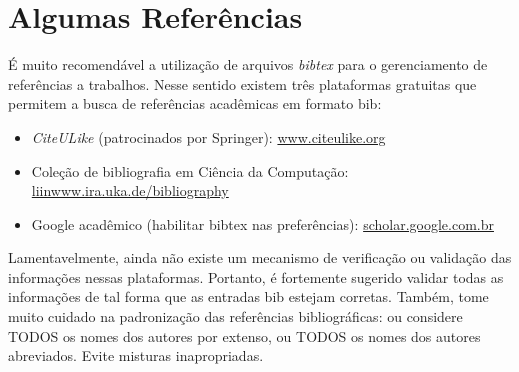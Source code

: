 \section{Algumas Referências}
\label{sec:algumas_referencias}

É muito recomendável a utilização de arquivos \emph{bibtex} para o gerenciamento
de referências a trabalhos. Nesse sentido existem três plataformas gratuitas
que permitem a busca de referências acadêmicas em formato bib: 
\begin{itemize}
	\item \emph{CiteULike} (patrocinados por Springer): \url{www.citeulike.org}
	\item Coleção de bibliografia em Ciência da Computação: \url{liinwww.ira.uka.de/bibliography}
	\item Google acadêmico (habilitar bibtex nas preferências): \url{scholar.google.com.br}
\end{itemize}
Lamentavelmente, ainda não existe um mecanismo de verificação ou validação das
informações nessas plataformas. Portanto, é fortemente sugerido validar todas
as informações de tal forma que as entradas bib estejam corretas.  Também, tome
muito cuidado na padronização das referências bibliográficas: ou considere TODOS
os nomes dos autores por extenso, ou TODOS os nomes dos autores abreviados.
Evite misturas inapropriadas.

